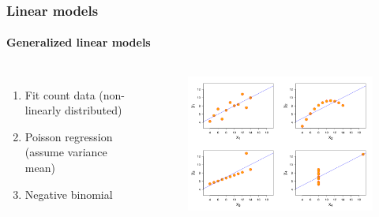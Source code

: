\documentclass[aspectratio=43]{beamer}
\begin{document}
\begin{frame}

	\frametitle{Linear models}
	\framesubtitle{Generalized linear models}
	
	\footnotesize
	
	\begin{columns}
		
		
		\begin{enumerate}
			\item Fit count data (non-linearly distributed)
			\item Poisson regression (assume variance ~ mean)
			\item Negative binomial
		\end{enumerate}
		
		
		\begin{figure}[!htb]
			\includegraphics[width = \linewidth]{plots/part2/linear_model.png}
		\end{figure}
		
	\end{columns}

\end{frame}
\end{document}
